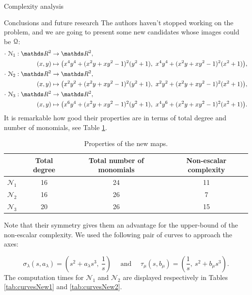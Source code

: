 \documentclass[11pt, a4paper, english, twoside, notitlepage, openright]{report}
\begin{document}
\begin{chapter}{Complexity analysis}
\begin{section}{Conclusions and future research}
The authors haven't stopped working on the problem, and we are going to present some new candidates whose images could be $\mathcal{Q}$:
\begin{align*}
\cdot\ \mathcal{N}_1:\R^2 &\to \R^2, \\
(x,y)&\mapsto\big(x^4y^4 + (x^2y + xy^2 - 1)^2(y^2 + 1),\ x^4y^4 + (x^2y + xy^2 - 1)^2(x^2 + 1)\big),\\
\cdot\ \mathcal{N}_2:\R^2 &\to \R^2, \\
(x,y)&\mapsto\big(x^2y^2 + (x^2y + xy^2 - 1)^2(y^2 + 1),\ x^2y^2 + (x^2y + xy^2 - 1)^2(x^2 + 1)\big),\\
\cdot\ \mathcal{N}_3:\R^2 &\to \R^2, \\
(x,y)&\mapsto\big(x^6y^4 + (x^2y + xy^2 - 1)^2(y^2 + 1),\ x^4y^6 + (x^2y + xy^2 - 1)^2(x^2 + 1)\big).
\end{align*}
It is remarkable how good their properties are in terms of total degree and number of monomials, see Table \ref{tab:newDegreeMon}.

\begin{table}[ht!]
\begin{center}
\begin{tabular}{c || c | c | c}
& Total degree & Total number of monomials & Non-escalar complexity\\ \hline \hline
$\mathcal{N}_1$ & 16 & 24 & 11 \\ \hline
$\mathcal{N}_2$ & 16 &  26 & 7 \\ \hline
$\mathcal{N}_3$ & 20 & 26 & 15 \\	
\end{tabular}
\caption{Properties of the new maps.}\label{tab:newDegreeMon}
\end{center}
\end{table}
Note that their symmetry gives them an advantage for the upper-bound of the non-escalar complexity. We used the following pair of curves to approach the axes:

$$
\sigma_\lambda(s, a_\lambda) = \left(s^2 + a_\lambda s^3,\ \frac{1}{s}\right)
\quad \text{ and } \quad
\tau_\mu(s, b_\mu) = \left(\frac{1}{s},\ s^2 + b_\mu s^3\right).
$$
The computation times for $\mathcal{N}_1$ and $\mathcal{N}_2$ are displayed respectively in Tables \ref{tab:curvesNew1} and \ref{tab:curvesNew2}.


\end{section}
\end{chapter}
\end{document}
